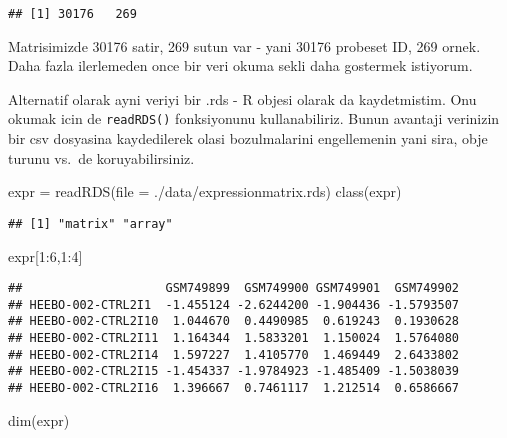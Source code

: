 \documentclass[
]{book}
\newenvironment{Shaded}{\begin{snugshade}}{\end{snugshade}}
\newcommand{\AttributeTok}[1]{\textcolor[rgb]{0.77,0.63,0.00}{#1}}
\newcommand{\DecValTok}[1]{\textcolor[rgb]{0.00,0.00,0.81}{#1}}
\newcommand{\FunctionTok}[1]{\textcolor[rgb]{0.00,0.00,0.00}{#1}}
\newcommand{\NormalTok}[1]{#1}
\newcommand{\OtherTok}[1]{\textcolor[rgb]{0.56,0.35,0.01}{#1}}
\newcommand{\SpecialCharTok}[1]{\textcolor[rgb]{0.00,0.00,0.00}{#1}}
\newcommand{\StringTok}[1]{\textcolor[rgb]{0.31,0.60,0.02}{#1}}
\begin{document}
\begin{verbatim}
## [1] 30176   269
\end{verbatim}

Matrisimizde 30176 satir, 269 sutun var - yani 30176 probeset ID, 269 ornek. Daha fazla ilerlemeden once bir veri okuma sekli daha gostermek istiyorum.

Alternatif olarak ayni veriyi bir .rds - R objesi olarak da kaydetmistim. Onu okumak icin de \texttt{readRDS()} fonksiyonunu kullanabiliriz. Bunun avantaji verinizin bir csv dosyasina kaydedilerek olasi bozulmalarini engellemenin yani sira, obje turunu vs.~de koruyabilirsiniz.

\begin{Shaded}
\begin{Highlighting}[]
\NormalTok{expr }\OtherTok{=} \FunctionTok{readRDS}\NormalTok{(}\AttributeTok{file =} \StringTok{\textquotesingle{}./data/expressionmatrix.rds\textquotesingle{}}\NormalTok{)}
\FunctionTok{class}\NormalTok{(expr)}
\end{Highlighting}
\end{Shaded}

\begin{verbatim}
## [1] "matrix" "array"
\end{verbatim}

\begin{Shaded}
\begin{Highlighting}[]
\NormalTok{expr[}\DecValTok{1}\SpecialCharTok{:}\DecValTok{6}\NormalTok{,}\DecValTok{1}\SpecialCharTok{:}\DecValTok{4}\NormalTok{]}
\end{Highlighting}
\end{Shaded}

\begin{verbatim}
##                    GSM749899  GSM749900 GSM749901  GSM749902
## HEEBO-002-CTRL2I1  -1.455124 -2.6244200 -1.904436 -1.5793507
## HEEBO-002-CTRL2I10  1.044670  0.4490985  0.619243  0.1930628
## HEEBO-002-CTRL2I11  1.164344  1.5833201  1.150024  1.5764080
## HEEBO-002-CTRL2I14  1.597227  1.4105770  1.469449  2.6433802
## HEEBO-002-CTRL2I15 -1.454337 -1.9784923 -1.485409 -1.5038039
## HEEBO-002-CTRL2I16  1.396667  0.7461117  1.212514  0.6586667
\end{verbatim}

\begin{Shaded}
\begin{Highlighting}[]
\FunctionTok{dim}\NormalTok{(expr)}
\end{Highlighting}
\end{Shaded}
\end{document}
